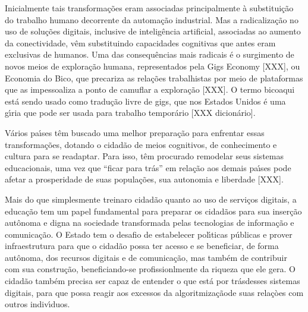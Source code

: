 \documentclass[
12pt,		%
openright,	%
twoside,  %
a4paper,			%
chapter=TITLE,		%
english,			%
french,				%
spanish,			%
brazil				%
]{USPSC-classe/USPSC_RedarTex}
\begin{document}
Inicialmente tais transforma\c{c}\~oes eram associadas principalmente \`a substitui\c{c}\~ao do trabalho humano decorrente da automa\c{c}\~ao industrial. Mas a radicaliza\c{c}\~ao no uso de solu\c{c}\~oes digitais, inclusive de intelig\^encia artificial, associadas ao aumento da conectividade, v\^em substituindo capacidades \textquotedbl cognitivas que antes eram exclusivas de humanos\textquotedbl [4]. Uma das consequ\^encias mais radicais \'e o surgimento de novos meios de explora\c{c}\~ao humana, representados pela \textquotedbl Gigs Economy [XXX], ou \textquotedbl Economia do Bico\textquotedbl , que precariza as rela\c{c}\~oes trabalhistas por meio de plataformas que as impessoaliza a ponto de camuflar a explora\c{c}\~ao [XXX]. O termo \textquotedbl bico\textquotedbl  aqui est\'a sendo usado como tradu\c{c}\~ao livre de \textquotedbl gigs\textquotedbl , que nos Estados Unidos \'e uma g\'{\i}ria que pode ser usada para trabalho tempor\'ario [XXX dicion\'ario].










V\'arios pa\'{\i}ses t\^em buscado uma melhor prepara\c{c}\~ao para enfrentar essas transforma\c{c}\~oes, dotando o cidad\~ao de meios cognitivos, de conhecimento e cultura para se readaptar. Para isso, t\^em procurado remodelar seus sistemas educacionais, uma vez que “ficar para tr\'as” em rela\c{c}\~ao aos demais pa\'{\i}ses pode afetar a prosperidade de suas popula\c{c}\~oes, sua autonomia e liberdade [XXX].










Mais do que simplesmente \textquotedbl treinar\textquotedbl  o cidad\~ao quanto ao uso  de servi\c{c}os digitais, a educa\c{c}\~ao tem um papel fundamental para preparar os cidad\~aos para sua inser\c{c}\~ao aut\^onoma e digna na sociedade transformada pelas tecnologias de informa\c{c}\~ao e comunica\c{c}\~ao. O Estado tem o desafio de estabelecer pol\'{\i}ticas p\'ublicas e prover infraestrutura para que o cidad\~ao possa ter acesso e se beneficiar, de forma aut\^onoma, dos recursos digitais e de comunica\c{c}\~ao, mas tamb\'em de contribuir com sua constru\c{c}\~ao, beneficiando-se profissionlmente da riqueza que ele gera. O cidad\~ao tamb\'em precisa ser capaz de entender \textquotedbl o que est\'a por tr\'as\textquotedbl  desses sistemas digitais, para que possa reagir aos excessos da \textquotedbl algoritmiza\c{c}\~ao\textquotedbl  de suas rela\c{c}òes com outros indiv\'{\i}duos.
\end{document}
